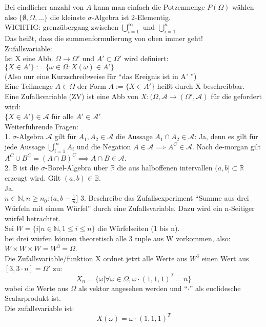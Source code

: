 \documentclass{article}
\begin{document}
	Bei eindlicher anzahl von $A$ kann man einfach die Potzenmenge $P(\Omega)$ wählen also $\{\emptyset,\Omega,\dots\}$ die kleinste $\sigma$-Algebra ist 2-Elementig.\\
	WICHTIG: grenzübergang zwischen $\bigcup^\infty_{i=1}$ und $\bigcup^n_{i=1}$\\
	Das heißt, dass die summenformulierung von oben immer geht!\\
	Zufallsvariable:\\
	Ist X eine Abb. $\Omega\to\Omega'$ und $A'\subset\Omega'$ wird definiert: $\{X\in A'\}:=\{\omega\in\Omega: X(\omega)\in A'\}$\\
	(Also nur eine Kurzschreibweise für ``das Ereignis ist in A' '')\\
	Eine Teilmenge $A\in\Omega$ der Form $A:= \{X\in A'\}$ heißt durch X beschreibbar.\\
	Eine Zufallsvariable (ZV) ist eine Abb von $X:(\Omega,\mathscr{A}\to(\Omega',\mathscr{A})$ für die gefordert wird:\\
	$\{X\in A'\}\in\mathscr{A}$ für alle $A'\in\mathscr{A}'$\\
	Weiterführende Fragen:\\
	1. $\sigma$-Algebra $\mathscr{A}$ gilt für $A_1,A_2\in\mathscr{A}$ die Aussage $A_1\cap A_2\in \mathscr{A}$: Ja, denn es gilt für jede Aussage $\bigcup^\infty_{i=1} A_i$ und die Negation $A\in \mathscr{A} \implies A^C\in \mathscr{A}$. Nach de-morgan gilt $A^C\cup B^C = (A\cap B)^C\implies A\cap B\in \mathscr{A}$.\\
	2. $\mathbb{B}$ ist die $\sigma$-Borel-Algebra über $\mathbb{R}$ die aus halboffenen intervallen $(a,b]\subset \mathbb{R}$ erzeugt wird. Gilt $(a,b)\in\mathbb{B}$.\\
	Ja.\\
	$n\in\mathbb{N}, n\geq n_0: (a,b-\frac{1}{n}]$
	3. Beschreibe das Zufallsexperiment ``Summe aus drei Würfeln mit einem Würfel'' durch eine Zufallsvariable. Dazu wird ein n-Seitiger würfel betrachtet.\\
	Sei $W=\{i|n\in\mathbb{N}, 1\leq i\leq n \}$ die Würfelseiten (1 bis n).\\
	bei drei würfen können theoretisch alle 3 tuple aus W vorkommen, also:\\
	$W\times W\times W = W^3=\Omega$.\\
	Die Zufallsvariable/funktion X ordnet jetzt alle Werte aus $W^3$ einen Wert aus $[3,3\cdot n] =\Omega'$ zu:\\
	\[X_n = \{\omega|\forall \omega\in\Omega, \omega\cdot (1,1,1)^T = n\}\]
	wobei die Werte aus $\Omega$ als vektor angesehen werden und ``$\cdot$'' als euclidesche Scalarprodukt ist.\\
	Die zufallsvariable ist:\\
	\[X(\omega) = \omega\cdot (1,1,1)^T\]
\end{document}
